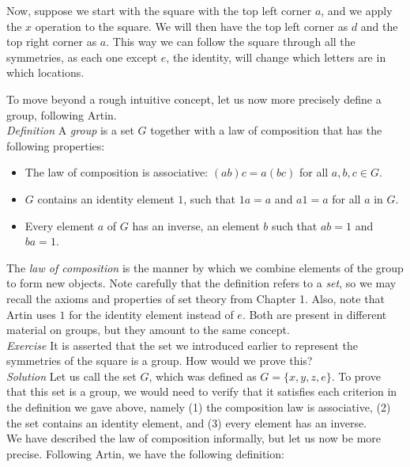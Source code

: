 Now, suppose we start with the square with the top left corner $a$, and we apply the $x$ operation to the square.  We will then have the top left corner as $d$ and the top right corner as $a$.  This way we can follow the square through all the symmetries, as each one except $e$, the identity, will change which letters are in which locations.

To move beyond a rough intuitive concept, let us now more precisely define a group, following Artin.\\

\textit{Definition} A \textit{group} is a set $G$ together with a law of composition that has the following properties:

\begin{itemize}
\item The law of composition is associative:  $(ab)c = a(bc)$ for all $a,b,c \in G.$
\item $G$ contains an identity element $1$, such that $1a=a$ and $a1=a$ for all $a$ in $G.$
\item Every element $a$ of $G$ has an inverse, an element $b$ such that $ab=1$ and $ba=1.$
\end{itemize}

The \textit{law of composition} is the manner by which we combine elements of the group to form new objects.  Note carefully that the definition refers to a \textit{set}, so we may recall the axioms and properties of set theory from Chapter 1.  Also, note that Artin uses $1$ for the identity element instead of $e$.  Both are present in different material on groups, but they amount to the same concept.\\

\textit{Exercise} It is asserted that the set we introduced earlier to represent the symmetries of the square is a group.  How would we prove this?\\

\textit{Solution}  Let us call the set $G$, which was defined as $G=\{x,y,z,e\}.$  To prove that this set is a group, we would need to verify that it satisfies each criterion in the definition we gave above, namely (1) the composition law is associative, (2) the set contains an identity element, and (3) every element has an inverse.\\

We have described the law of composition informally, but let us now be more precise.  Following Artin, we have the following definition:

